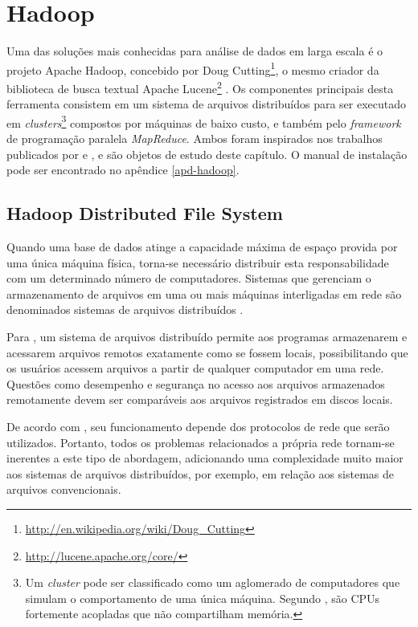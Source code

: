 \chapter{Hadoop}
\label{cap:hadoop}

Uma das soluções mais conhecidas para análise de dados em larga escala é o projeto Apache Hadoop, concebido por Doug Cutting\footnote{\url{http://en.wikipedia.org/wiki/Doug_Cutting}}, o mesmo criador da biblioteca de busca textual Apache Lucene\footnote{\url{http://lucene.apache.org/core/}} \cite{white2012}. Os componentes principais desta ferramenta consistem em um sistema de arquivos distribuídos para ser executado em \textit{clusters}\footnote{Um \textit{cluster} pode ser classificado como um aglomerado de computadores que simulam o comportamento de uma única máquina. Segundo , são CPUs fortemente acopladas que não compartilham memória.} compostos por máquinas de baixo custo, e também pelo \textit{framework} de programação paralela \textit{MapReduce}. Ambos foram inspirados nos trabalhos publicados por  e , e são objetos de estudo deste capítulo. O manual de instalação pode ser encontrado no apêndice \ref{apd-hadoop}.

\section{Hadoop Distributed File System}

Quando uma base de dados atinge a capacidade máxima de espaço provida por uma única máquina física, torna-se necessário distribuir esta responsabilidade com um determinado número de computadores. Sistemas que gerenciam o armazenamento de arquivos em uma ou mais máquinas interligadas em rede são denominados sistemas de arquivos distribuídos \cite{white2012}. 

Para , um sistema de arquivos distribuído permite aos programas armazenarem e acessarem arquivos remotos exatamente como se fossem locais, possibilitando que os usuários acessem arquivos a partir de qualquer computador em uma rede. Questões como desempenho e segurança no acesso aos arquivos armazenados remotamente devem ser comparáveis aos arquivos registrados em discos locais.

De acordo com , seu funcionamento depende dos protocolos de rede que serão utilizados. Portanto, todos os problemas relacionados a própria rede tornam-se inerentes a este tipo de abordagem, adicionando uma complexidade muito maior aos sistemas de arquivos distribuídos, por exemplo, em relação aos sistemas de arquivos convencionais.

